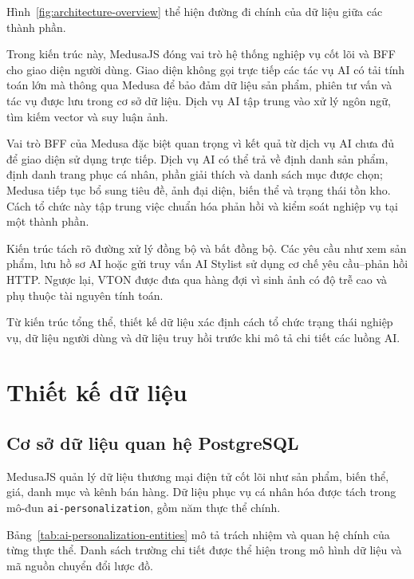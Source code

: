 \medskip

Hình~\ref{fig:architecture-overview} thể hiện đường đi chính của dữ liệu giữa các thành phần.



Trong kiến trúc này, MedusaJS đóng vai trò hệ thống nghiệp vụ cốt lõi và BFF cho giao diện người dùng. Giao diện không gọi trực tiếp các tác vụ AI có tải tính toán lớn mà thông qua Medusa để bảo đảm dữ liệu sản phẩm, phiên tư vấn và tác vụ được lưu trong cơ sở dữ liệu. Dịch vụ AI tập trung vào xử lý ngôn ngữ, tìm kiếm vector và suy luận ảnh.

\medskip

Vai trò BFF của Medusa đặc biệt quan trọng vì kết quả từ dịch vụ AI chưa đủ để giao diện sử dụng trực tiếp. Dịch vụ AI có thể trả về định danh sản phẩm, định danh trang phục cá nhân, phần giải thích và danh sách mục được chọn; Medusa tiếp tục bổ sung tiêu đề, ảnh đại diện, biến thể và trạng thái tồn kho. Cách tổ chức này tập trung việc chuẩn hóa phản hồi và kiểm soát nghiệp vụ tại một thành phần.

\medskip

Kiến trúc tách rõ đường xử lý đồng bộ và bất đồng bộ. Các yêu cầu như xem sản phẩm, lưu hồ sơ AI hoặc gửi truy vấn AI Stylist sử dụng cơ chế yêu cầu--phản hồi HTTP. Ngược lại, VTON được đưa qua hàng đợi vì sinh ảnh có độ trễ cao và phụ thuộc tài nguyên tính toán.

\medskip

Từ kiến trúc tổng thể, thiết kế dữ liệu xác định cách tổ chức trạng thái nghiệp vụ, dữ liệu người dùng và dữ liệu truy hồi trước khi mô tả chi tiết các luồng AI.

\section{Thiết kế dữ liệu}

\subsection{Cơ sở dữ liệu quan hệ PostgreSQL}

MedusaJS quản lý dữ liệu thương mại điện tử cốt lõi như sản phẩm, biến thể, giá, danh mục và kênh bán hàng. Dữ liệu phục vụ cá nhân hóa được tách trong mô-đun \mbox{\texttt{ai-personalization}}, gồm năm thực thể chính.

\medskip

Bảng~\ref{tab:ai-personalization-entities} mô tả trách nhiệm và quan hệ chính của từng thực thể. Danh sách trường chi tiết được thể hiện trong mô hình dữ liệu và mã nguồn chuyển đổi lược đồ.

